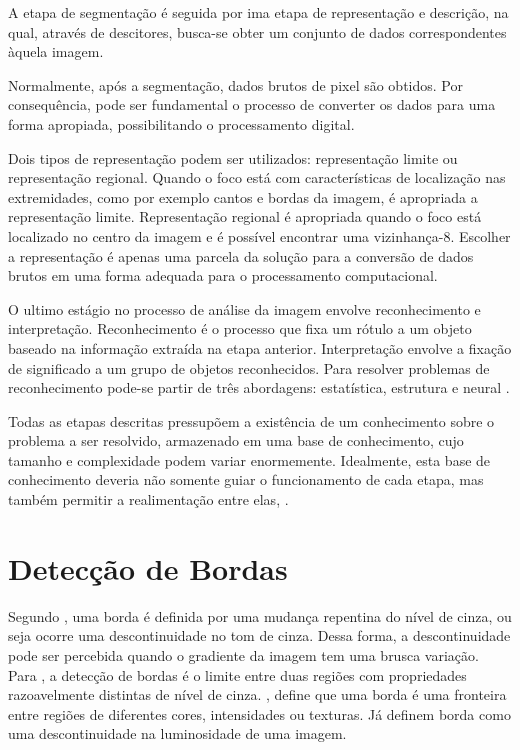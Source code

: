 A etapa de segmentação é seguida por ima etapa de representação e descrição, na qual, através de descitores, busca-se obter um conjunto de dados correspondentes àquela imagem.

Normalmente, após a segmentação, dados brutos de pixel são obtidos. Por consequência, pode ser fundamental o processo de converter os dados para uma forma apropiada, possibilitando o processamento digital. 

Dois tipos de representação podem ser utilizados: representação limite ou representação regional. Quando o foco está com características de localização nas extremidades, como por exemplo cantos e bordas da imagem, é apropriada a representação limite. Representação regional é apropriada quando o foco está localizado no centro da imagem e é possível encontrar uma vizinhança-8. Escolher a representação é apenas uma parcela da solução para a conversão de dados brutos em uma forma adequada para o processamento computacional. \cite{Rodrigues2002}

O ultimo estágio no processo de análise da imagem envolve reconhecimento e interpretação. Reconhecimento é o processo que fixa um rótulo a um objeto baseado na informação extraída na etapa anterior. Interpretação envolve a fixação de significado a um grupo de objetos reconhecidos. Para resolver problemas de reconhecimento pode-se partir de três abordagens: estatística, estrutura e neural \cite{GONZALEZ1992}.

Todas as etapas descritas pressupõem a existência de um conhecimento sobre o problema a ser resolvido, armazenado em uma base de conhecimento, cujo tamanho e complexidade podem variar enormemente. Idealmente, esta base de conhecimento deveria não somente guiar o funcionamento de cada etapa, mas também permitir a realimentação entre elas, \cite{marques1999}.


\section{Detecção de Bordas}

Segundo , uma borda é definida por uma mudança repentina do nível de cinza, ou seja ocorre uma descontinuidade no tom de cinza. Dessa forma, a descontinuidade pode ser percebida quando o gradiente da imagem tem uma brusca variação. Para , a detecção de bordas é o limite entre duas regiões com propriedades razoavelmente distintas de nível de cinza. , define que uma borda é uma fronteira entre regiões de diferentes cores, intensidades ou texturas. Já  definem borda como uma descontinuidade na luminosidade de uma imagem.

